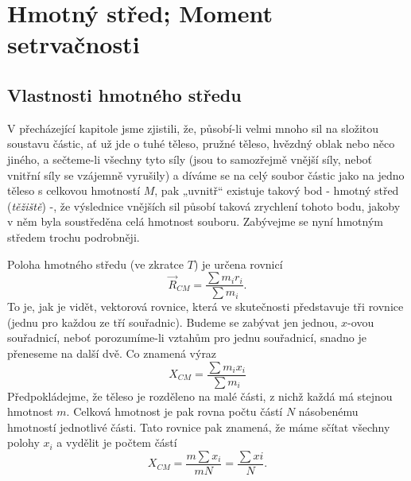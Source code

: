 \setchaptertoc
\chapter{Hmotný střed; Moment setrvačnosti}\label{fyz:IchapXIX}
  \section{Vlastnosti hmotného středu}\label{fyz:IchapXIXsecI}
    V přecházející kapitole jsme zjistili, že, působí-li velmi mnoho sil na složitou soustavu
    částic, ať už jde o tuhé těleso, pružné těleso, hvězdný oblak nebo něco jiného, a sečteme-li
    všechny tyto síly (jsou to samozřejmě vnější síly, neboť vnitřní síly se vzájemně vyrušily) a
    díváme se na celý soubor částic jako na jedno těleso s celkovou hmotností \(M\), pak „uvnitř“
    existuje takový bod - hmotný střed (\emph{těžiště}) -, že výslednice vnějších sil působí taková
    zrychlení tohoto bodu, jakoby v něm byla soustředěna celá hmotnost souboru. Zabývejme se nyní
    hmotným středem trochu podrobněji.
    
    Poloha hmotného středu (ve zkratce \(T\)) je určena rovnicí
    \begin{equation}\label{fyz:eq739}
      \vec{R}_{CM}=\frac{∑m_ir_i}{∑m_i}.
    \end{equation}
    To je, jak je vidět, vektorová rovnice, která ve skutečnosti představuje tři rovnice (jednu pro
    každou ze tří souřadnic). Budeme se zabývat jen jednou, \(x\)-ovou souřadnicí, neboť
    porozumíme-li vztahům pro jednu souřadnicí, snadno je přeneseme na další dvě. Co znamená výraz
    \begin{equation}\label{fyz:eq740}
      X_{CM}=\frac{∑m_ix_i}{∑m_i}
    \end{equation}
    Předpokládejme, že těleso je rozděleno na malé části, z nichž každá má stejnou hmotnost \(m\).
    Celková hmotnost je pak rovna počtu částí \(N\) násobenému hmotností jednotlivé části. Tato
    rovnice pak znamená, že máme sčítat všechny polohy \(x_i\) a vydělit je počtem částí
    \begin{equation}\label{fyz:eq743}
      X_{CM} =  \frac{m∑x_i}{mN}= \frac{∑xi}{N}.
    \end{equation}
    
